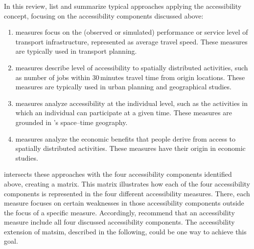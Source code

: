 In this review, \citet{Geurs2004AccessibilityReview} list and summarize typical approaches applying the accessibility concept, 
focusing on the accessibility components discussed above:

\begin{enumerate}\styleEnumerate
	\item {} measures focus on the (observed or simulated) performance or service level 
	of transport infrastructure, \eg represented as average travel speed. These measures are typically used 
	in transport planning.
	
	\item {} measures describe level of accessibility to spatially distributed activities, such as 
	 number of jobs within 30\,minutes travel time from origin locations. These measures are typically used 
	in urban planning and geographical studies.
	
	
	\item {} measures analyze accessibility at the individual level, such as the activities in which an 
	individual can participate at a given time. These measures are grounded in \citet{Haegerstrand1970WhatAboutPeople}'s space–time geography.
	
	\item {} measures analyze the economic benefits that people derive from access to spatially 
	distributed activities. These measures have their origin in economic studies.
\end{enumerate}

\citet{Geurs2004AccessibilityReview} intersects these approaches with the four accessibility components identified 
above, creating a matrix. This matrix illustrates how each of the four accessibility components is 
 represented in the four different accessibility measures. There, each measure focuses on certain weaknesses 
in those accessibility components outside the focus of a specific measure. Accordingly, \citet{Geurs2004AccessibilityReview} recommend that an accessibility measure include all four discussed accessibility components. The accessibility extension of \gls{matsim}, described in 
the following, could be one way to achieve this goal.

